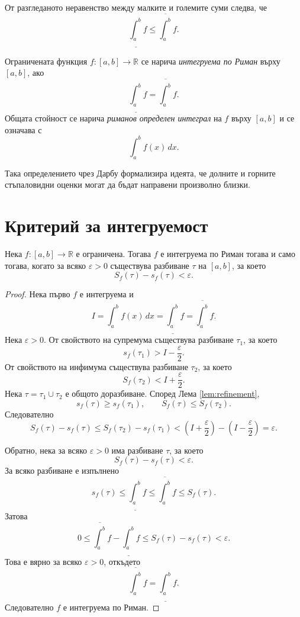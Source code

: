 От разгледаното неравенство между малките и големите суми следва, че
\[
\underline{\int_a^b} f\leq\overline{\int_a^b} f.
\]

\begin{defn}
Ограничената функция $f\colon[a,b]\to\mathbb{R}$ се нарича \emph{интегруема по Риман} върху $[a,b]$, ако
\[
\underline{\int_a^b} f=\overline{\int_a^b} f.
\]
Общата стойност се нарича \emph{риманов определен интеграл} на $f$ върху $[a,b]$ и се означава с
\[
\int_a^b f(x)\,dx.
\]
\end{defn}

Така определението чрез Дарбу формализира идеята, че долните и горните стъпаловидни оценки могат да бъдат направени произволно близки.

\section{Критерий за интегруемост}\label{s:33.2}

\begin{thm}
\label{thm:darbourcriterion}
Нека $f\colon[a,b]\to\mathbb{R}$ е ограничена. Тогава $f$ е интегруема по Риман тогава и само тогава, когато за всяко $\varepsilon>0$ съществува разбиване $\tau$ на $[a,b]$, за което
\[
S_f(\tau)-s_f(\tau)<\varepsilon.
\]
\end{thm}

\begin{proof}
Нека първо $f$ е интегруема и
\[
I=\int_a^b f(x)\,dx
=
\underline{\int_a^b}f
=
\overline{\int_a^b}f.
\]
Нека $\varepsilon>0$. От свойството на супремума съществува разбиване $\tau_1$, за което
\[
s_f(\tau_1)>I-\frac{\varepsilon}{2}.
\]
От свойството на инфимума съществува разбиване $\tau_2$, за което
\[
S_f(\tau_2)<I+\frac{\varepsilon}{2}.
\]
Нека $\tau=\tau_1\cup\tau_2$ е общото доразбиване. Според Лема \ref{lem:refinement},
\[
s_f(\tau)\geq s_f(\tau_1),
\qquad
S_f(\tau)\leq S_f(\tau_2).
\]
Следователно
\[
S_f(\tau)-s_f(\tau)
\leq S_f(\tau_2)-s_f(\tau_1)
<
\left(I+\frac{\varepsilon}{2}\right)
-
\left(I-\frac{\varepsilon}{2}\right)
=
\varepsilon.
\]

Обратно, нека за всяко $\varepsilon>0$ има разбиване $\tau$, за което
\[
S_f(\tau)-s_f(\tau)<\varepsilon.
\]
За всяко разбиване е изпълнено
\[
s_f(\tau)\leq\underline{\int_a^b}f
\leq\overline{\int_a^b}f
\leq S_f(\tau).
\]
Затова
\[
0\leq
\overline{\int_a^b}f-\underline{\int_a^b}f
\leq S_f(\tau)-s_f(\tau)
<\varepsilon.
\]
Това е вярно за всяко $\varepsilon>0$, откъдето
\[
\overline{\int_a^b}f=\underline{\int_a^b}f.
\]
Следователно $f$ е интегруема по Риман.
\end{proof}

